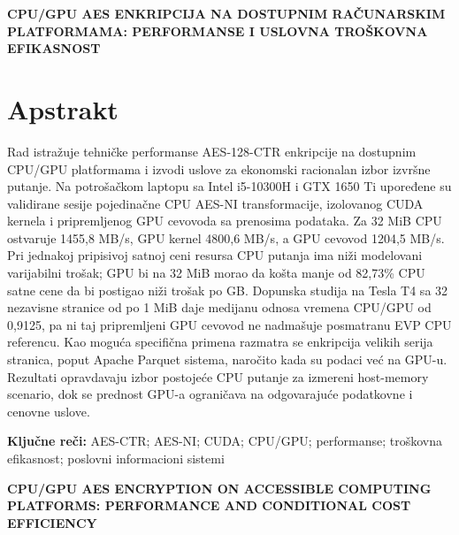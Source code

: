 \documentclass[11pt,b5paper]{article}
\begin{document}
\begin{center}
{\fontsize{13}{15}\selectfont\bfseries
CPU/GPU AES ENKRIPCIJA NA DOSTUPNIM RAČUNARSKIM PLATFORMAMA: PERFORMANSE I USLOVNA TROŠKOVNA EFIKASNOST\par}
\end{center}
\vspace{.2cm}
\section*{Apstrakt}
Rad istražuje tehničke performanse AES-128-CTR enkripcije na dostupnim CPU/GPU platformama i izvodi uslove za ekonomski racionalan izbor izvršne putanje. Na potrošačkom laptopu sa Intel i5-10300H i GTX 1650 Ti upoređene su validirane sesije pojedinačne CPU AES-NI transformacije, izolovanog CUDA kernela i pripremljenog GPU cevovoda sa prenosima podataka. Za 32 MiB CPU ostvaruje 1455,8 MB/s, GPU kernel 4800,6 MB/s, a GPU cevovod 1204,5 MB/s. Pri jednakoj pripisivoj satnoj ceni resursa CPU putanja ima niži modelovani varijabilni trošak; GPU bi na 32 MiB morao da košta manje od 82,73\% CPU satne cene da bi postigao niži trošak po GB. Dopunska studija na Tesla T4 sa 32 nezavisne stranice od po 1 MiB daje medijanu odnosa vremena CPU/GPU od 0,9125, pa ni taj pripremljeni GPU cevovod ne nadmašuje posmatranu EVP CPU referencu. Kao moguća specifična primena razmatra se enkripcija velikih serija stranica, poput Apache Parquet sistema, naročito kada su podaci već na GPU-u. Rezultati opravdavaju izbor postojeće CPU putanje za izmereni host-memory scenario, dok se prednost GPU-a ograničava na odgovarajuće podatkovne i cenovne uslove.

\noindent\textbf{Ključne reči:} AES-CTR; AES-NI; CUDA; CPU/GPU; performanse; troškovna efikasnost; poslovni informacioni sistemi
\vspace{.35cm}
\begin{center}
{\fontsize{13}{15}\selectfont\bfseries
CPU/GPU AES ENCRYPTION ON ACCESSIBLE COMPUTING PLATFORMS: PERFORMANCE AND CONDITIONAL COST EFFICIENCY\par}
\end{center}
\vspace{.2cm}
\end{document}
